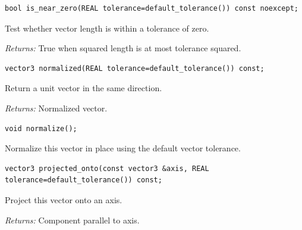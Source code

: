 \par\noindent\begin{minipage}{\linewidth}
\begin{lstlisting}[style=apireference]
bool is_near_zero(REAL tolerance=default_tolerance()) const noexcept;
\end{lstlisting}
{\footnotesize Test whether vector length is within a tolerance of zero.\par}
{\footnotesize\textit{Returns:} True when squared length is at most tolerance squared.\par}
\end{minipage}\par\vspace{1pt}
\par\noindent\begin{minipage}{\linewidth}
\begin{lstlisting}[style=apireference]
vector3 normalized(REAL tolerance=default_tolerance()) const;
\end{lstlisting}
{\footnotesize Return a unit vector in the same direction.\par}
{\footnotesize\textit{Returns:} Normalized vector.\par}
\end{minipage}\par\vspace{1pt}
\par\noindent\begin{minipage}{\linewidth}
\begin{lstlisting}[style=apireference]
void normalize();
\end{lstlisting}
{\footnotesize Normalize this vector in place using the default vector tolerance.\par}
\end{minipage}\par\vspace{1pt}
\par\noindent\begin{minipage}{\linewidth}
\begin{lstlisting}[style=apireference]
vector3 projected_onto(const vector3 &axis, REAL tolerance=default_tolerance()) const;
\end{lstlisting}
{\footnotesize Project this vector onto an axis.\par}
{\footnotesize\textit{Returns:} Component parallel to axis.\par}
\end{minipage}\par\vspace{1pt}
